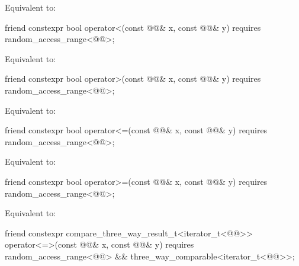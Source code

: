 \begin{itemdescr}
\pnum
\effects
Equivalent to: 
\end{itemdescr}

%
\begin{itemdecl}
friend constexpr bool operator<(const @@& x, const @@& y)
  requires random_access_range<@@>;
\end{itemdecl}

\begin{itemdescr}
\pnum
\effects
Equivalent to: 
\end{itemdescr}

%
\begin{itemdecl}
friend constexpr bool operator>(const @@& x, const @@& y)
  requires random_access_range<@@>;
\end{itemdecl}

\begin{itemdescr}
\pnum
\effects
Equivalent to: 
\end{itemdescr}

%
\begin{itemdecl}
friend constexpr bool operator<=(const @@& x, const @@& y)
  requires random_access_range<@@>;
\end{itemdecl}

\begin{itemdescr}
\pnum
\effects
Equivalent to: 
\end{itemdescr}

%
\begin{itemdecl}
friend constexpr bool operator>=(const @@& x, const @@& y)
  requires random_access_range<@@>;
\end{itemdecl}

\begin{itemdescr}
\pnum
\effects
Equivalent to: 
\end{itemdescr}

%
\begin{itemdecl}
friend constexpr compare_three_way_result_t<iterator_t<@@>>
  operator<=>(const @@& x, const @@& y)
    requires random_access_range<@@> && three_way_comparable<iterator_t<@@>>;
\end{itemdecl}

